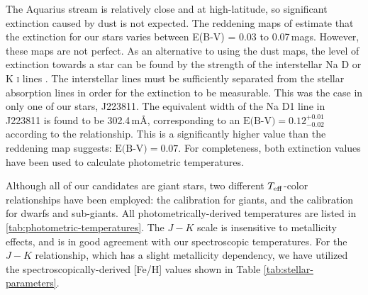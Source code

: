 \documentclass{emulateapj}
\begin{document}
The Aquarius stream is relatively close and at high-latitude, so significant extinction caused by dust is not expected. The reddening maps of \citet{schlegel;et-al_1998} estimate that the extinction for our stars varies between E(B-V) = 0.03 to 0.07\,mags. However, these maps are not perfect. As an alternative to using the \citet{schlegel;et-al_1998} dust maps, the level of extinction towards a star can be found by the strength of the interstellar Na D or K \textsc{i} lines \citep{munari;zwitter_1997}. The interstellar lines must be sufficiently separated from the stellar absorption lines in order for the extinction to be measurable. This was the case in only one of our stars, J223811. The equivalent width of the Na D1 line in J223811 is found to be 302.4\,m{\AA}, corresponding to an $\mbox{E(B-V)} = 0.12^{+0.01}_{-0.02}$ according to the \citet{munari;zwitter_1997} relationship. This is a significantly higher value than the \citet{schlegel;et-al_1998} reddening map suggests: $\mbox{E(B-V)} = 0.07$. For completeness, both extinction values have been used to calculate photometric temperatures. 

Although all of our candidates are giant stars, two different $T_{\rm eff}$-color relationships have been employed: the \citet{alonso;et-al_1999} calibration for giants, and the \citet{casagrande;et-al_2010} calibration for dwarfs and sub-giants. All photometrically-derived temperatures are listed in \ref{tab:photometric-temperatures}. The \citet{alonso;et-al_1999} $J-K$ scale is insensitive to metallicity effects, and is in good agreement with our spectroscopic temperatures. For the \citet{casagrande;et-al_2010} $J-K$ relationship, which has a slight metallicity dependency, we have utilized the spectroscopically-derived [Fe/H] values shown in Table \ref{tab:stellar-parameters}.
\end{document}
